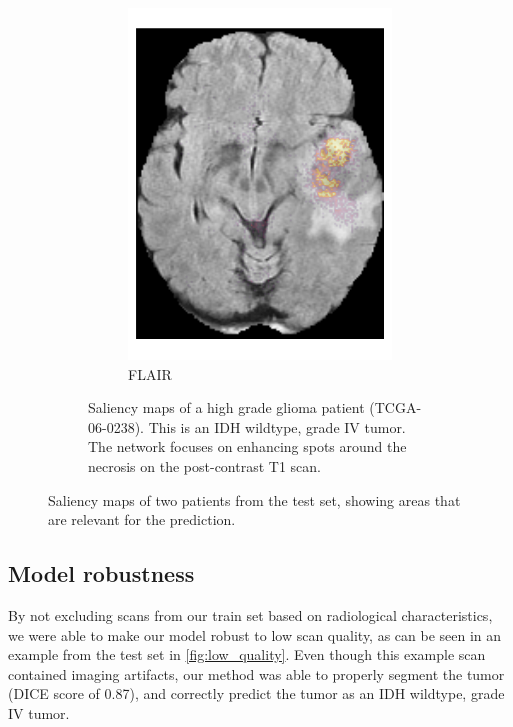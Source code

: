 \begin{figure}[htbp]
\begin{subfigure}[b]{\textwidth}
\begin{subfigure}[b]{0.24\textwidth}
        \includegraphics[width=\textwidth]{Figures/saliency_HGG_FLAIR.png}
        \caption*{\acrshort{FLAIR}}
        \end{subfigure}
        \caption{Saliency maps of a high grade glioma patient (TCGA-06-0238). This is an IDH wildtype, grade IV tumor.
        The network focuses on enhancing spots around the necrosis on the post-contrast \gls{T1} scan.}\label{fig:saliency_HGG}
    \end{subfigure}

\caption{Saliency maps of two patients from the test set, showing areas that are relevant for the prediction.}\label{fig:saliency_maps}
\end{figure}

\subsection{Model robustness}

By not excluding scans from our train set based on radiological characteristics, we were able to make our model robust to low scan quality, as can be seen in an example from the test set in \cref{fig:low_quality}.
Even though this example scan contained imaging artifacts, our method was able to properly segment the tumor (DICE score of 0.87), and correctly predict the tumor as an IDH wildtype, grade IV tumor.


